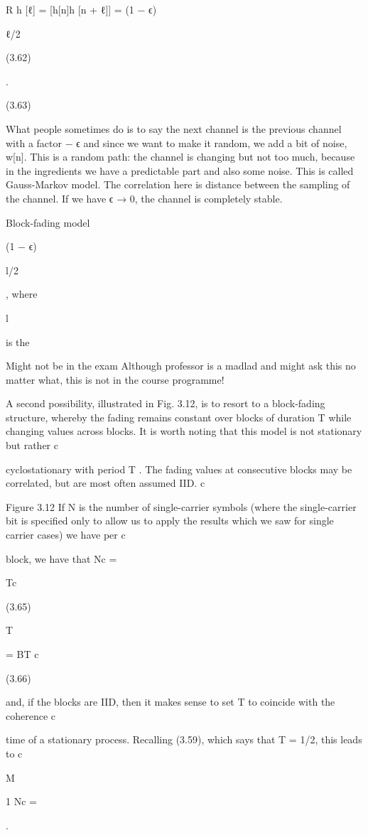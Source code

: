 {{{{R h [ℓ] = [h[n]h [n + ℓ]]
= (1 − ϵ)

ℓ/2

(3.62)

.

(3.63)

What people sometimes do is to say the next channel is the previous channel with a factor  − ϵ and since we want to make it random, we add a bit of noise, w[n].
This is a random path: the channel is changing but not too much, because in the ingredients we have a predictable part and also some noise.
This is called Gauss-Markov model. The correlation here is distance between the sampling of the channel.
If we have ϵ → 0, the channel is completely stable.

Block-fading model

(1 − ϵ)

l/2

, where

l

is the

Might not be in the exam Although professor is a madlad and might ask this no matter what, this is not in the course programme!

A second possibility, illustrated in Fig. 3.12, is to resort to a block-fading structure,
whereby the fading remains constant over blocks of duration T while changing values across blocks. It is worth noting that this model is not stationary but rather c

cyclostationary with period T . The fading values at consecutive blocks may be correlated, but are most often assumed IID.
c

Figure 3.12 If N is the number of single-carrier symbols (where the single-carrier bit is specified only to allow us to apply the results which we saw for single carrier cases) we have per c

block, we have that Nc =

Tc

(3.65)

T

= BT c

(3.66)

and, if the blocks are IID, then it makes sense to set T to coincide with the coherence c

time of a stationary process. Recalling (3.59), which says that T = 1/2\nu , this leads to c

M

1 Nc =

.

}}}}
